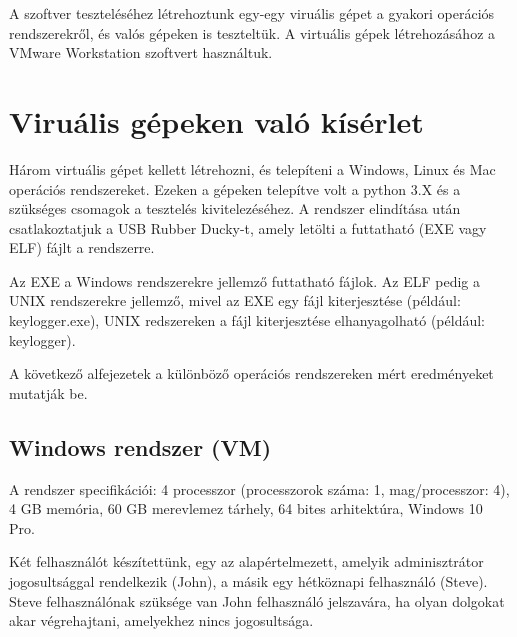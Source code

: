 \documentclass[12pt,a4paper,oneside]{report}
\begin{document}
A szoftver teszteléséhez létrehoztunk egy-egy viruális gépet a gyakori operációs rendszerekről, és valós gépeken is teszteltük. A virtuális gépek létrehozásához a VMware Workstation szoftvert használtuk.

\section{Viruális gépeken való kísérlet}
Három virtuális gépet kellett létrehozni, és telepíteni a Windows, Linux és Mac operációs rendszereket. Ezeken a gépeken telepítve volt a python 3.X és a szükséges csomagok a tesztelés kivitelezéséhez. A rendszer elindítása után csatlakoztatjuk a USB Rubber Ducky-t, amely letölti a futtatható (EXE vagy ELF) fájlt a rendszerre.

Az EXE a Windows rendszerekre jellemző futtatható fájlok. Az ELF pedig a UNIX rendszerekre jellemző, mivel az EXE egy fájl kiterjesztése (például: keylogger.exe), UNIX redszereken a fájl kiterjesztése elhanyagolható (például: keylogger).

A következő alfejezetek a különböző operációs rendszereken mért eredményeket mutatják be.

\subsection{Windows rendszer (VM)}
A rendszer specifikációi: 4 processzor (processzorok száma: 1, mag/processzor: 4), 4 GB memória, 60 GB merevlemez tárhely, 64 bites arhitektúra, Windows 10 Pro.

Két felhasználót készítettünk, egy az alapértelmezett, amelyik adminisztrátor jogosultsággal rendelkezik (John), a másik egy hétköznapi felhasználó (Steve). Steve felhasználónak szüksége van John felhasználó jelszavára, ha olyan dolgokat akar végrehajtani, amelyekhez nincs jogosultsága.
\end{document}
